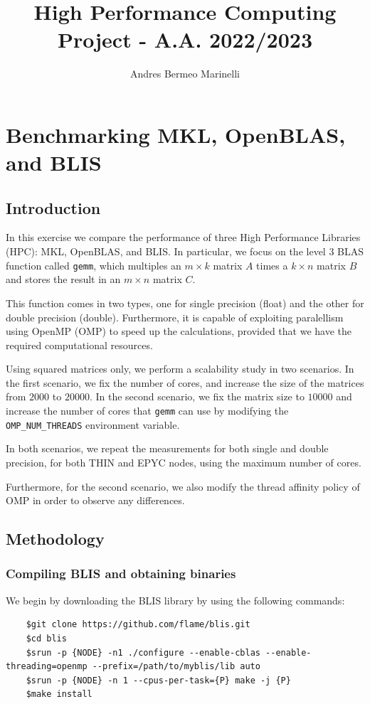 \documentclass{report}
\title{High Performance Computing Project - A.A. 2022/2023}
\author{Andres Bermeo Marinelli}
\begin{document}
\maketitle
\tableofcontents
\chapter{Benchmarking MKL, OpenBLAS, and BLIS}

\section{Introduction}

In this exercise we compare the performance of three High Performance Libraries
(HPC): MKL, OpenBLAS, and BLIS. In particular, we focus on the level 3 BLAS 
function called \texttt{gemm}, which multiples an $m \times k$ matrix $A$ times 
a $k \times n$ matrix $B$ and stores the result in an $m \times n$ matrix $C$. 

This function comes in two types, one for single 
precision (float) and the other for double precision (double). Furthermore, it 
is capable of exploiting paralellism using OpenMP (OMP) to speed up the 
calculations, provided that we have the required computational resources.

Using squared matrices only, we perform a scalability study in two scenarios. 
In the first scenario, we fix the number of cores, and increase the size of the
matrices from $2000$ to $20000$. In the second scenario, we fix the matrix size 
to $10000$ and increase the number of cores that \texttt{gemm} can use by 
modifying the \texttt{OMP\_NUM\_THREADS} environment variable.

In both scenarios, we repeat the measurements for both single and double
precision, for both THIN and EPYC nodes, using the maximum number of cores.

Furthermore, for the second scenario, we also modify the thread affinity policy 
of OMP in order to observe any differences.

\section{Methodology}

\subsection{Compiling BLIS and obtaining binaries}

We begin by downloading the BLIS library by using the following commands:
\begin{verbatim}
    $git clone https://github.com/flame/blis.git
    $cd blis
    $srun -p {NODE} -n1 ./configure --enable-cblas --enable-threading=openmp --prefix=/path/to/myblis/lib auto
    $srun -p {NODE} -n 1 --cpus-per-task={P} make -j {P}
    $make install
\end{verbatim}
\end{document}
